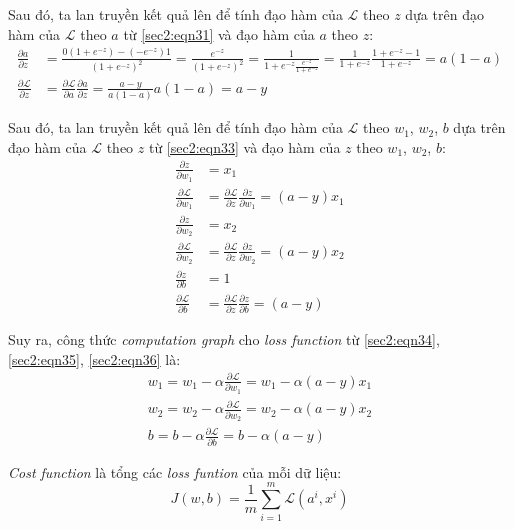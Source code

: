 Sau đó, ta lan truyền kết quả lên để tính đạo hàm của $\mathcal{L}$ theo $z$ dựa trên đạo hàm của $\mathcal{L}$ theo $a$ từ \ref{sec2:eqn31} và đạo hàm của $a$ theo $z$:
\begin{align}
\frac{\partial a}{\partial z} &=  \frac{0(1 + e^{-z}) - (-e^{-z})1}{(1+e^{-z})^{2}} = \frac{e^{-z}}{(1+e^{-z})^{2}} = \frac{1}{1+e^{-z}\frac{e^{-z}}{1+e^{-z}}} = \frac{1}{1+e^{-z}}\frac{1+e^{-z}-1}{1+e^{-z}} = a(1-a)\\
\label{sec2:eqn33}
\frac{\partial \mathcal{L}}{\partial z} &= \frac{\partial \mathcal{L}}{\partial a}\frac{\partial a}{\partial z} = \frac{a-y}{a(1-a)}a(1-a) = a-y
\end{align}

Sau đó, ta lan truyền kết quả lên để tính đạo hàm của $\mathcal{L}$ theo $w_{1}$, $w_{2}$, $b$ dựa trên đạo hàm của $\mathcal{L}$ theo $z$ từ \ref{sec2:eqn33} và đạo hàm của $z$ theo $w_{1}$, $w_{2}$, $b$:
\begin{align}
\label{sec2:eqn34}
\frac{\partial z}{\partial w_{1}} &=  x_{1} \nonumber\\
\frac{\partial \mathcal{L}}{\partial w_{1}} &= \frac{\partial \mathcal{L}}{\partial z}\frac{\partial z}{\partial w_{1}} = (a-y)x_{1}\\
\label{sec2:eqn35}
\frac{\partial z}{\partial w_{2}} &=  x_{2} \nonumber\\
\frac{\partial \mathcal{L}}{\partial w_{2}} &= \frac{\partial \mathcal{L}}{\partial z}\frac{\partial z}{\partial w_{2}} = (a-y)x_{2}\\
\label{sec2:eqn36}
\frac{\partial z}{\partial b} &=  1 \nonumber\\
\frac{\partial \mathcal{L}}{\partial b} &= \frac{\partial \mathcal{L}}{\partial z}\frac{\partial z}{\partial b} = (a-y)
\end{align}

Suy ra, công thức \textit{computation graph} cho \textit{loss function} từ \ref{sec2:eqn34}, \ref{sec2:eqn35}, \ref{sec2:eqn36} là:
\begin{align}
\label{sec2:eqn37}
w_{1} = w_{1} - \alpha\frac{\partial \mathcal{L}}{\partial w_{1}} = w_{1} - \alpha(a-y)x_{1}\\
\label{sec2:eqn38}
w_{2} = w_{2} - \alpha\frac{\partial \mathcal{L}}{\partial w_{2}} = w_{2} - \alpha(a-y)x_{2}\\
\label{sec2:eqn39}
b = b - \alpha\frac{\partial \mathcal{L}}{\partial b} = b - \alpha(a-y)
\end{align}

\textit{Cost function} là tổng các \textit{loss funtion} của mỗi dữ liệu:
\begin{equation}
\label{sec2:eqn40}
J(w,b) = \frac{1}{m}\sum_{i=1}^{m}\mathcal{L}(a^{i}, x^{i}) 
\end{equation}

